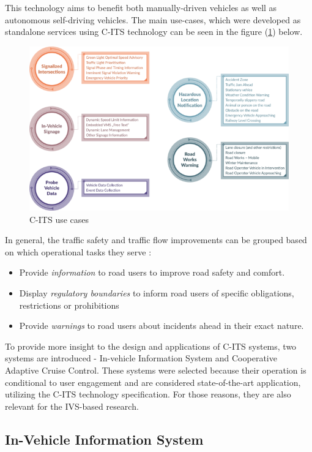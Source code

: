 \documentclass[main.tex]{subfiles}
\begin{document}
This technology aims to benefit both manually-driven vehicles 
as well as autonomous self-driving vehicles. The main use-cases, which were developed as
standalone services using C-ITS technology can be seen in the figure (\ref{c-its-use-case})
below.

\begin{figure}[htbp]
    \centering
    \includegraphics[width=.8\textwidth]{c-its-kolecka.png}
    \caption{C-ITS use cases \cite{2022}}
    \label{c-its-use-case}
\end{figure}

In general, the traffic safety and traffic flow improvements can be grouped based on which 
operational tasks they serve \cite{CRoads2021}: 

\begin{itemize}
    \item Provide \emph{information} to road users to improve road safety and comfort.
    \item Display \emph{regulatory boundaries} to inform road users of specific obligations, 
    restrictions or prohibitions
    \item Provide \emph{warnings} to road users about incidents ahead in their exact nature. 
\end{itemize}

To provide more insight to the design and applications of C-ITS systems, two systems are 
introduced - In-vehicle Information System and Cooperative Adaptive Cruise Control. These 
systems were selected because their operation is conditional to user engagement and are 
considered state-of-the-art application, utilizing the C-ITS technology specification. For 
those reasons, they are also relevant for the IVS-based research. 

\subsection{In-Vehicle Information System}
\end{document}
